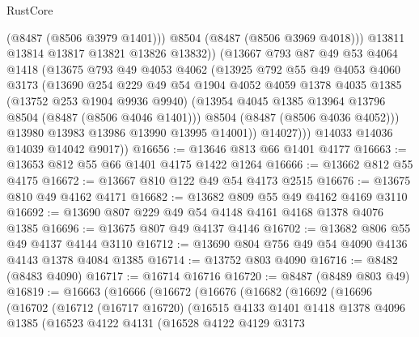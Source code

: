 \begin{lexlean}{RustCore}
\begin{coremodule}
                    (@8487 (@8506 @3979 @1401)))
                  @8504
                  (@8487 (@8506 @3969 @4018)))
                @13811
                @13814
                @13817
                @13821
                @13826
                @13832))
            (@13667
              @793
              @87
              @49
              @53
              @4064
              @1418
              (@13675
                @793
                @49
                @4053
                @4062
                (@13925
                  @792
                  @55
                  @49
                  @4053
                  @4060
                  @3173
                  (@13690
                    @254
                    @229
                    @49
                    @54
                    @1904
                    @4052
                    @4059
                    @1378
                    @4035
                    @1385
                    (@13752 @253 @1904 @9936 @9940)
                    (@13954 @4045 @1385 @13964 @13796 @8504 (@8487 (@8506 @4046 @1401)))
                    @8504
                    (@8487 (@8506 @4036 @4052)))
                  @13980
                  @13983
                  @13986
                  @13990
                  @13995
                  @14001))
              @14027)))
        @14033
        @14036
        @14039
        @14042
        @9017))
@16656 := @13646 @813 @66 @1401 @4177
@16663 := @13653 @812 @55 @66 @1401 @4175 @1422 @1264
@16666 := @13662 @812 @55 @4175
@16672 := @13667 @810 @122 @49 @54 @4173 @2515
@16676 := @13675 @810 @49 @4162 @4171
@16682 := @13682 @809 @55 @49 @4162 @4169 @3110
@16692 := @13690 @807 @229 @49 @54 @4148 @4161 @4168 @1378 @4076 @1385
@16696 := @13675 @807 @49 @4137 @4146
@16702 := @13682 @806 @55 @49 @4137 @4144 @3110
@16712 := @13690 @804 @756 @49 @54 @4090 @4136 @4143 @1378 @4084 @1385
@16714 := @13752 @803 @4090
@16716 := @8482 (@8483 @4090)
@16717 := @16714 @16716
@16720 := @8487 (@8489 @803 @49)
@16819 := @16663
    (@16666
      (@16672
        (@16676
          (@16682
            (@16692
              (@16696
                (@16702
                  (@16712
                    (@16717 @16720)
                    (@16515
                      @4133
                      @1401
                      @1418
                      @1378
                      @4096
                      @1385
                      (@16523
                        @4122
                        @4131
                        (@16528
                          @4122
                          @4129
                          @3173

\end{coremodule}
\end{lexlean}
